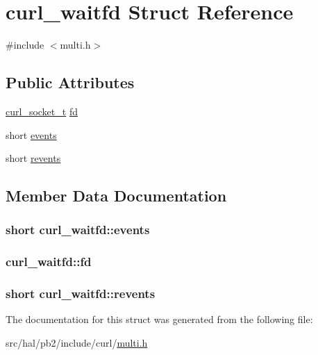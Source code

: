 \hypertarget{structcurl__waitfd}{}\section{curl\+\_\+waitfd Struct Reference}
\label{structcurl__waitfd}


{\ttfamily \#include $<$multi.\+h$>$}

\subsection*{Public Attributes}
\begin{DoxyCompactItemize}
\item 
\hyperlink{curl_8h_adb5a46d02359d2379dc7e0904c987828}{curl\+\_\+socket\+\_\+t} \hyperlink{structcurl__waitfd_ae4712fac510d50249e1a430a3d160a17}{fd}
\item 
short \hyperlink{structcurl__waitfd_ac8286d3f03be1a2f2d43a9516251f0f2}{events}
\item 
short \hyperlink{structcurl__waitfd_a14e87b528f4a052ec65edbc14b6ab080}{revents}
\end{DoxyCompactItemize}


\subsection{Member Data Documentation}
\subsubsection[{\texorpdfstring{events}{events}}]{\setlength{\rightskip}{0pt plus 5cm}short curl\+\_\+waitfd\+::events}\hypertarget{structcurl__waitfd_ac8286d3f03be1a2f2d43a9516251f0f2}{}\label{structcurl__waitfd_ac8286d3f03be1a2f2d43a9516251f0f2}
\subsubsection[{\texorpdfstring{fd}{fd}}]{ curl\+\_\+waitfd\+::fd}\hypertarget{structcurl__waitfd_ae4712fac510d50249e1a430a3d160a17}{}\label{structcurl__waitfd_ae4712fac510d50249e1a430a3d160a17}
\subsubsection[{\texorpdfstring{revents}{revents}}]{\setlength{\rightskip}{0pt plus 5cm}short curl\+\_\+waitfd\+::revents}\hypertarget{structcurl__waitfd_a14e87b528f4a052ec65edbc14b6ab080}{}\label{structcurl__waitfd_a14e87b528f4a052ec65edbc14b6ab080}


The documentation for this struct was generated from the following file\+:\begin{DoxyCompactItemize}
\item 
src/hal/pb2/include/curl/\hyperlink{multi_8h}{multi.\+h}\end{DoxyCompactItemize}
